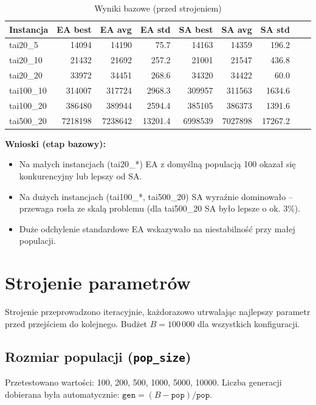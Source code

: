 \documentclass[11pt,a4paper]{article}
\begin{document}
\begin{table}[H]
\centering
\caption{Wyniki bazowe (przed strojeniem)}
\begin{tabular}{lrrrrrrrr}
\toprule
Instancja & EA best & EA avg & EA std & SA best & SA avg & SA std \\
\midrule
tai20\_5   & 14094 & 14190 & 75.7  & 14163 & 14359 & 196.2 \\
tai20\_10  & 21432 & 21692 & 257.2 & 21001 & 21547 & 436.8 \\
tai20\_20  & 33972 & 34451 & 268.6 & 34320 & 34422 & 60.0  \\
tai100\_10 & 314007 & 317724 & 2968.3 & 309957 & 311563 & 1634.6 \\
tai100\_20 & 386480 & 389944 & 2594.4 & 385105 & 386373 & 1391.6 \\
tai500\_20 & 7218198 & 7238642 & 13201.4 & 6998539 & 7027898 & 17267.2 \\
\bottomrule
\end{tabular}
\end{table}

\textbf{Wnioski (etap bazowy):}
\begin{itemize}
    \item Na małych instancjach (tai20\_*) EA z domyślną populacją 100 okazał się konkurencyjny lub lepszy od SA.
    \item Na dużych instancjach (tai100\_*, tai500\_20) SA wyraźnie dominowało -- przewaga rosła ze skalą problemu (dla tai500\_20 SA było lepsze o ok. 3\%).
    \item Duże odchylenie standardowe EA wskazywało na niestabilność przy małej populacji.
\end{itemize}

\section{Strojenie parametrów}
\label{sec:tuning}

Strojenie przeprowadzono iteracyjnie, każdorazowo utrwalając najlepszy parametr przed przejściem do kolejnego. Budżet $B = 100\,000$ dla wszystkich konfiguracji.

\subsection{Rozmiar populacji (\texttt{pop\_size})}

Przetestowano wartości: 100, 200, 500, 1000, 5000, 10000. Liczba generacji dobierana była automatycznie: $\texttt{gen} = (B - \texttt{pop}) / \texttt{pop}$.
\end{document}
